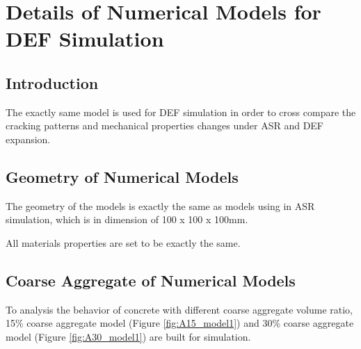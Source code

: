 \section{Details of Numerical Models for DEF Simulation}

\subsection{Introduction}

The exactly same model is used for DEF simulation in order to cross compare the cracking patterns and mechanical properties changes under ASR and DEF expansion.

\subsection{Geometry of Numerical Models}

The geometry of the models is exactly the same as models using in ASR simulation, which is in dimension of 100 x 100 x 100mm.

All materials properties are set to be exactly the same.

\subsection{Coarse Aggregate of Numerical Models}

To analysis the behavior of concrete with different coarse aggregate volume ratio, 15\% coarse aggregate model (Figure \ref{fig:A15_model1}) and 30\% coarse aggregate model (Figure \ref{fig:A30_model1}) are built for simulation.

